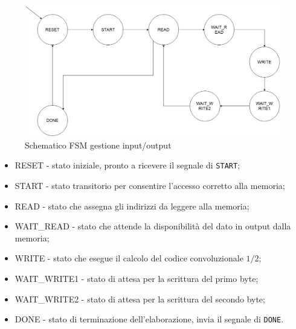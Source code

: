 \documentclass{article}
\begin{document}
\begin{figure}[H]
\centerline{\includegraphics[scale=0.5]{fsm_sincrona.jpg}}
\centering
\caption{Schematico FSM gestione input/output}
\centering
\end{figure}

\begin{itemize}
    \item RESET - stato iniziale, pronto a ricevere il segnale di \verb|START|;
    \item START - stato transitorio per consentire l'accesso corretto alla memoria;
    \item READ - stato che assegna gli indirizzi da leggere alla memoria;
    \item WAIT\_READ - stato che attende la disponibilità del dato in output dalla memoria;
    \item WRITE - stato che esegue il calcolo del codice convoluzionale $1/2$;
    \item WAIT\_WRITE1 - stato di attesa per la scrittura del primo byte;
    \item WAIT\_WRITE2 - stato di attesa per la scrittura del secondo byte;
    \item DONE - stato di terminazione dell'elaborazione, invia il segnale di \verb|DONE|.
\end{itemize}
\end{document}
